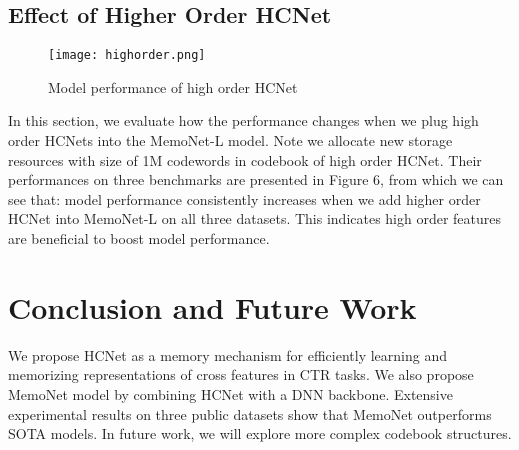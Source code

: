\documentclass[sigconf,authorversion]{acmart}
\begin{document}
\subsection{Effect of Higher Order HCNet}
\begin{figure}[h]
  \centering
\texttt{[image: highorder.png]}
\caption{Model performance of high order HCNet}
  \Description{}
\end{figure}
In this section, we evaluate how the performance changes when we plug high order HCNets into the MemoNet-L model. Note we allocate new storage resources with size of 1M codewords in codebook of high order HCNet. Their performances on three benchmarks are presented in Figure 6, from which we can see that: model performance consistently increases when we add higher order HCNet into MemoNet-L on all three datasets. This indicates high order features are beneficial to boost model performance. 

\section{Conclusion and Future Work}
We propose HCNet as a memory mechanism for efficiently learning and memorizing representations of cross features in CTR tasks. We also propose  MemoNet model by combining HCNet with a DNN backbone. Extensive experimental results on three public datasets show that MemoNet outperforms SOTA models. In future work, we will explore more complex codebook structures. 







\balance

\end{document}
